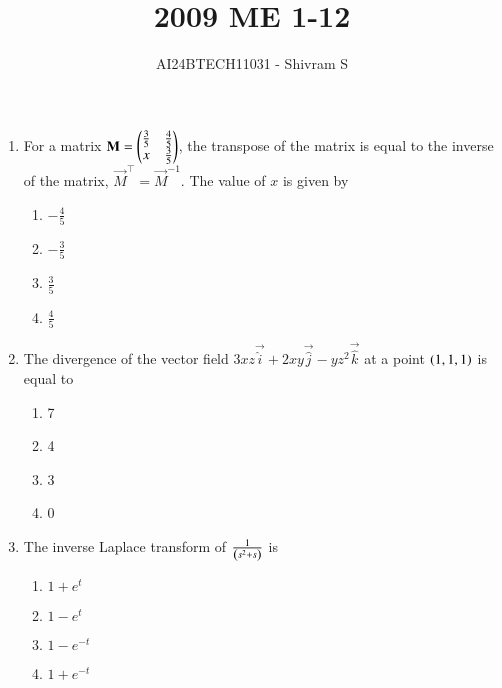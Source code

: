 \documentclass[journal]{IEEEtran}
\begin{document}

\onecolumn

\title{2009 ME 1-12}
\author{AI24BTECH11031 - Shivram S}
\maketitle
\bigskip

\renewcommand{\thefigure}{\theenumi}
\renewcommand{\thetable}{\theenumi}

\begin{enumerate}
    \item For a matrix $\mathbf{M} = \begin{pmatrix}\frac{3}{5} & \frac{4}{5} \\ x & \frac{3}{5}\end{pmatrix}$,
    the transpose of the matrix is equal to the inverse of the matrix, $\vec{M}^\top = \vec{M}^{-1}$.
    The value of $x$ is given by
    \begin{multicols}{4}
    \begin{enumerate}
        \item $-\frac{4}{5}$
        \item $-\frac{3}{5}$
        \item $\frac{3}{5}$
        \item $\frac{4}{5}$
    \end{enumerate}
    \end{multicols}

    \item The divergence of the vector field $3xz\vec{\hat{i}} + 2xy\vec{\hat{j}} - yz^2\vec{\hat{k}}$
    at a point $\left(1, 1, 1\right)$ is equal to
    \begin{multicols}{4}
    \begin{enumerate}
        \item 7
        \item 4
        \item 3
        \item 0
    \end{enumerate}
    \end{multicols}

    \item The inverse Laplace transform of $\frac{1}{\left(s^2 + s\right)}$ is
    \begin{multicols}{4}
    \begin{enumerate}
        \item $1 + e^t$
        \item $1 - e^t$
        \item $1 - e^{-t}$
        \item $1 + e^{-t}$
    \end{enumerate}
    \end{multicols}


\end{enumerate}
\end{document}

